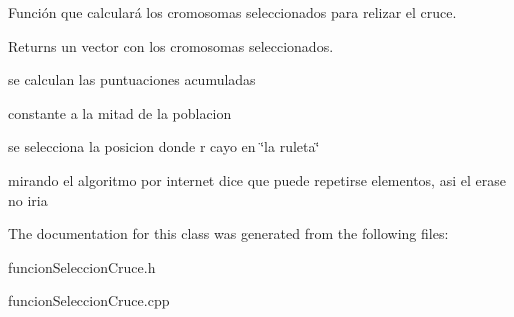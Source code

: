 Función que calculará los cromosomas seleccionados para relizar el cruce. 

\begin{DoxyReturn}{Returns}
un vector con los cromosomas seleccionados. 
\end{DoxyReturn}
se calculan las puntuaciones acumuladas

constante a la mitad de la poblacion

se selecciona la posicion donde r cayo en \char`\"{}la ruleta\char`\"{}

mirando el algoritmo por internet dice que puede repetirse elementos, asi el erase no iria 

The documentation for this class was generated from the following files\-:\begin{DoxyCompactItemize}
\item 
funcion\-Seleccion\-Cruce.\-h\item 
funcion\-Seleccion\-Cruce.\-cpp\end{DoxyCompactItemize}
